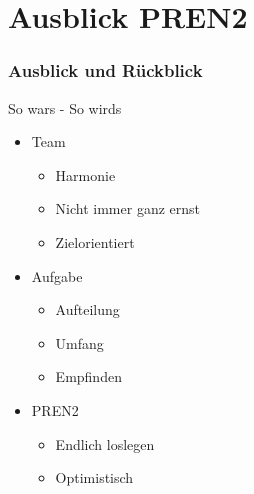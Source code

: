 \section{Ausblick PREN2} %
\begin{frame}
    \frametitle{Ausblick und Rückblick}
	\begin{block}{So wars - So wirds}
		\begin{itemize}
			\item Team
			\begin{itemize}
				\item Harmonie
				\item Nicht immer ganz ernst
				\item Zielorientiert
			\end{itemize}
			\item Aufgabe
			\begin{itemize}
				\item Aufteilung
				\item Umfang
				\item Empfinden
			\end{itemize}
			\item PREN2
			\begin{itemize}
				\item Endlich loslegen 
				\item Optimistisch
			\end{itemize}
		\end{itemize}
	\end{block}
\end{frame}

